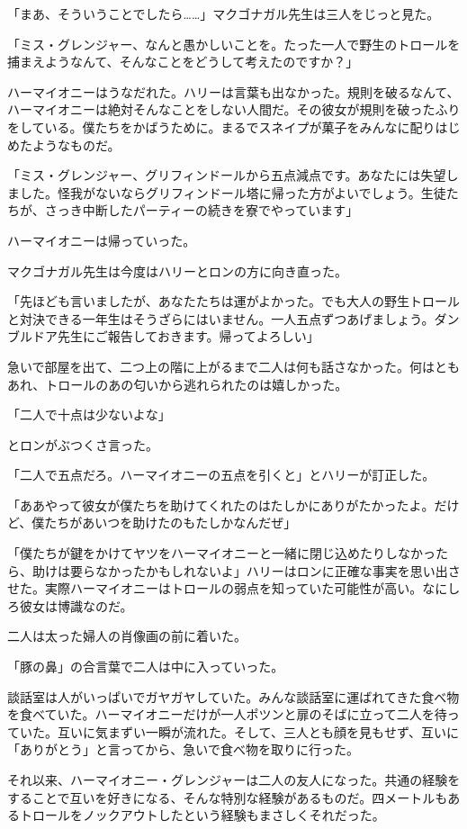 \documentclass[10pt,a4paper]{article}
\begin{document}
\begin{CJK}{UTF8}{min}
「まあ、そういうことでしたら……」マクゴナガル先生は三人をじっと見た。

「ミス・グレンジャー、なんと愚かしいことを。たった一人で野生のトロールを捕まえようなんて、そんなことをどうして考えたのですか？」

ハーマイオニーはうなだれた。ハリーは言葉も出なかった。規則を破るなんて、ハーマイオニーは絶対そんなことをしない人間だ。その彼女が規則を破ったふりをしている。僕たちをかばうために。まるでスネイプが菓子をみんなに配りはじめたようなものだ。

「ミス・グレンジャー、グリフィンドールから五点減点です。あなたには失望しました。怪我がないならグリフィンドール塔に帰った方がよいでしょう。生徒たちが、さっき中断したパーティーの続きを寮でやっています」

ハーマイオニーは帰っていった。

マクゴナガル先生は今度はハリーとロンの方に向き直った。

「先ほども言いましたが、あなたたちは運がよかった。でも大人の野生トロールと対決できる一年生はそうざらにはいません。一人五点ずつあげましょう。ダンブルドア先生にご報告しておきます。帰ってよろしい」

急いで部屋を出て、二つ上の階に上がるまで二人は何も話さなかった。何はともあれ、トロールのあの匂いから逃れられたのは嬉しかった。

「二人で十点は少ないよな」

とロンがぶつくさ言った。

「二人で五点だろ。ハーマイオニーの五点を引くと」とハリーが訂正した。

「ああやって彼女が僕たちを助けてくれたのはたしかにありがたかったよ。だけど、僕たちがあいつを助けたのもたしかなんだぜ」

「僕たちが鍵をかけてヤツをハーマイオニーと一緒に閉じ込めたりしなかったら、助けは要らなかったかもしれないよ」ハリーはロンに正確な事実を思い出させた。実際ハーマイオニーはトロールの弱点を知っていた可能性が高い。なにしろ彼女は博識なのだ。

二人は太った婦人の肖像画の前に着いた。

「豚の鼻」の合言葉で二人は中に入っていった。

談話室は人がいっぱいでガヤガヤしていた。みんな談話室に運ばれてきた食べ物を食べていた。ハーマイオニーだけが一人ポツンと扉のそばに立って二人を待っていた。互いに気まずい一瞬が流れた。そして、三人とも顔を見もせず、互いに「ありがとう」と言ってから、急いで食べ物を取りに行った。

それ以来、ハーマイオニー・グレンジャーは二人の友人になった。共通の経験をすることで互いを好きになる、そんな特別な経験があるものだ。四メートルもあるトロールをノックアウトしたという経験もまさしくそれだった。





\end{CJK}
\end{document}
